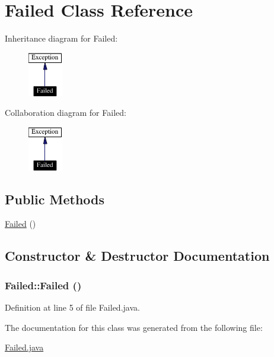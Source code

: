 \hypertarget{classFailed}{
\section{Failed  Class Reference}
\label{classFailed}
}
Inheritance diagram for Failed:\begin{figure}[H]
\begin{center}
\leavevmode
\includegraphics[width=43pt]{classFailed__inherit__graph}
\end{center}
\end{figure}
Collaboration diagram for Failed:\begin{figure}[H]
\begin{center}
\leavevmode
\includegraphics[width=43pt]{classFailed__coll__graph}
\end{center}
\end{figure}
\subsection*{Public Methods}
\begin{CompactItemize}
\item 
\hyperlink{classFailed_a0}{Failed} ()
\end{CompactItemize}


\subsection{Constructor \& Destructor Documentation}
\hypertarget{classFailed_a0}{
\subsubsection[Failed]{\setlength{\rightskip}{0pt plus 5cm}Failed::Failed ()}}
\label{classFailed_a0}




Definition at line 5 of file Failed.java.

The documentation for this class was generated from the following file:\begin{CompactItemize}
\item 
\hyperlink{Failed_8java-source}{Failed.java}\end{CompactItemize}
